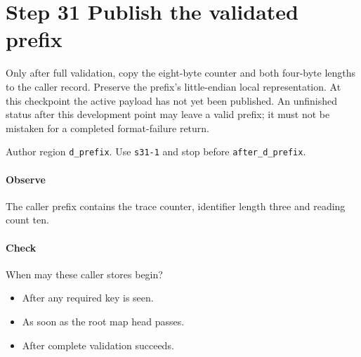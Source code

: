 \section{Step 31 Publish the validated prefix}\label{cbor-s31}
Only after full validation, copy the eight-byte counter and both four-byte lengths to the caller record. Preserve the prefix's little-endian local representation. At this checkpoint the active payload has not yet been published. An unfinished status after this development point may leave a valid prefix; it must not be mistaken for a completed format-failure return.

Author region \texttt{d\_prefix}. Use \texttt{s31-1} and stop before \texttt{after\_d\_prefix}.

\paragraph{Observe} The caller prefix contains the trace counter, identifier length three and reading count ten.

\paragraph{Check} When may these caller stores begin?
\begin{itemize}
  \item[A.] After any required key is seen.
  \item[B.] As soon as the root map head passes.
  \item[C.] After complete validation succeeds.
\end{itemize}
